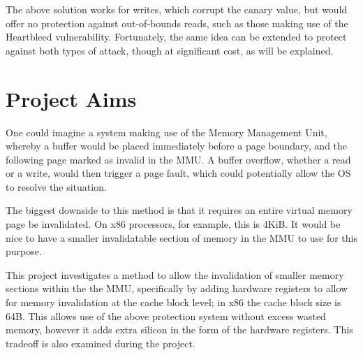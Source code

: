 The above solution works for writes, which corrupt the canary value, but would offer no protection against out-of-bounds reads, such as those making use of the Heartbleed vulnerability. Fortunately, the same idea can be extended to protect against both types of attack, though at significant cost, as will be explained.

\section{Project Aims}
One could imagine a system making use of the Memory Management Unit, whereby a buffer would be placed immediately before a page boundary, and the following page marked as invalid in the MMU. A buffer overflow, whether a read or a write, would then trigger a page fault, which could potentially allow the OS to resolve the situation.

The biggest downside to this method is that it requires an entire virtual memory page be invalidated. On x86 processors, for example, this is 4KiB. It would be nice to have a smaller invalidatable section of memory in the MMU to use for this purpose.

This project investigates a method to allow the invalidation of smaller memory sections within the the MMU, specifically by adding hardware registers to allow for memory invalidation at the cache block level; in x86 the cache block size is 64B. This allows use of the above protection system without excess wasted memory, however it adds extra silicon in the form of the hardware registers. This tradeoff is also examined during the project.